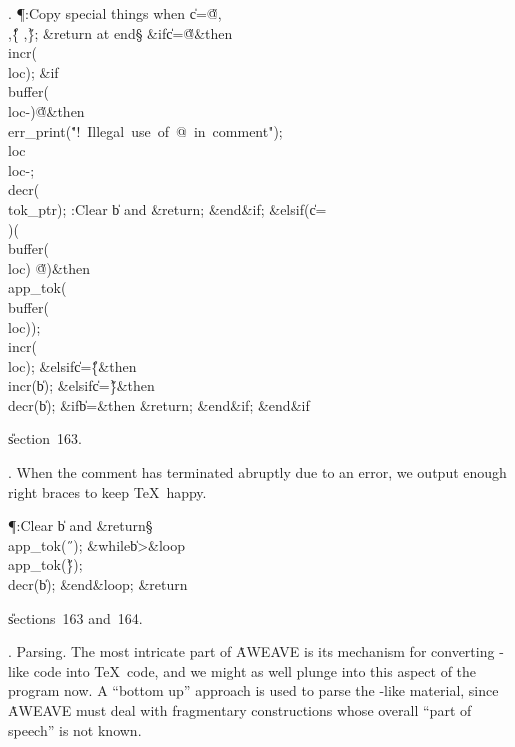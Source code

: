 . \P\?:Copy special things when \|c\?=\?\H{@}\?,\?\H{\\}\?,\?\H{\{}%
\?,\?\H{\}}; \&{return} at end\X\S\?\6
\&{if}\1\1\8\|c\?=\?\H{@}\2\8\&{then}\6
\\{incr}\?\1(\?\\{loc}\?\2)\?;\6
\&{if}\1\1\8\\{buffer}\?\1(\?\\{loc}\?-\?\2)\I\?\H{@}\2\8\&{then}\6
\\{err\_print}\?\1(\?\.{"!\ Illegal\ use\ of\ @\ in\ comment"}\?\2)\?;\6
\\{loc}\?\K\?\\{loc}\?-;\5
\\{decr}\?\1(\?\\{tok\_ptr}\?\2)\?;\5
:Clear \|b and \?\&{return}\?\X;\2\6
\&{end}\8\2\&{if}\1;\6
\4\&{elsif}\1\?\8\1(\?\|c\?=\?\H{\\}\?\2)\W\1(\?\\{buffer}\?\1(\?\\{loc}\?\2)\I%
\?\H{@}\?\2)\?\2\8\&{then}\6
\\{app\_tok}\?\1(\?\\{buffer}\?\1(\?\\{loc}\?\2)\2)\?;\5
\\{incr}\?\1(\?\\{loc}\?\2)\?;\6
\4\&{elsif}\1\8\|c\?=\?\H{\{}\2\8\&{then}\6
\\{incr}\?\1(\?\|b\?\2)\?;\6
\4\&{elsif}\1\8\|c\?=\?\H{\}}\2\8\&{then}\6
\\{decr}\?\1(\?\|b\?\2)\?;\6
\&{if}\1\1\8\|b\?=\2\8\&{then}\6
\?\&{return}\?;\2\6
\&{end}\8\2\&{if}\1;\2\6
\&{end}\8\2\&{if}\1\par
\U section~163.\fi

. When the comment has terminated abruptly due to an error, we output
enough right braces to keep \TeX\ happy.

\Y\P\?\4:Clear \|b and \?\&{return}\?\X\S\?\6
\\{app\_tok}\?\1(\?\H{\ }\?\2)\?;\6
\1\&{while}\8\|b\?>\8\&{loop}\6
\\{app\_tok}\?\1(\?\H{\}}\?\2)\?;\5
\\{decr}\?\1(\?\|b\?\2)\?;\2\6
\&{end}\8\&{loop};\6
\?\&{return}\?\par
\U sections~163 and~164.\fi

.  Parsing.
The most intricate part of \.{AWEAVE} is its mechanism for converting
\ADA-like code into \TeX\ code, and we might as well plunge into this
aspect of the program now. A ``bottom up'' approach is used to parse the
\ADA-like material, since \.{AWEAVE} must deal with fragmentary
constructions whose overall ``part of speech'' is not known.

